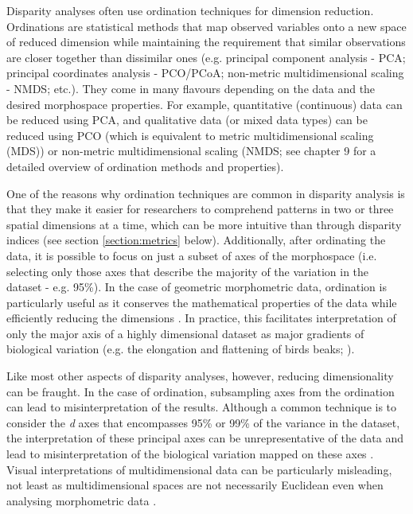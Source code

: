 \documentclass[12pt,letterpaper]{article}
\begin{document}
Disparity analyses often use ordination techniques for dimension reduction.
Ordinations are statistical methods that map observed variables onto a new space of reduced dimension while maintaining the requirement that similar observations are closer together than dissimilar ones (e.g. principal component analysis - PCA; principal coordinates analysis - PCO/PCoA; non-metric multidimensional scaling - NMDS; etc.).
They come in many flavours depending on the data and the desired morphospace properties.
For example, quantitative (continuous) data can be reduced using PCA, and qualitative data (or mixed data types) can be reduced using PCO (which is equivalent to metric multidimensional scaling (MDS)) or non-metric multidimensional scaling (NMDS; see \citealt{Legendre2012} chapter 9 for a detailed overview of ordination methods and properties).

One of the reasons why ordination techniques are common in disparity analysis is that they make it easier for researchers to comprehend patterns in two or three spatial dimensions at a time, which can be more intuitive than through disparity indices (see section \ref{section:metrics} below).
Additionally, after ordinating the data, it is possible to focus on just a subset of axes of the morphospace (i.e.
selecting only those axes that describe the majority of the variation in the dataset - e.g. 95\%).
In the case of geometric morphometric data, ordination is particularly useful as it conserves the mathematical properties of the data while efficiently reducing the dimensions \citep{Legendre2012,dryden2016statistical}.
In practice, this facilitates interpretation of only the major axis of a highly dimensional dataset as major gradients of biological variation (e.g. the elongation and flattening of birds beaks; \citealt{bright2016shapes}).

Like most other aspects of disparity analyses, however, reducing dimensionality can be fraught.
In the case of ordination, subsampling axes from the ordination can lead to misinterpretation of the results.
Although a common technique is to consider the \textit{d} axes that encompasses 95\% or 99\% of the variance in the dataset, the interpretation of these principal axes can be unrepresentative of the data and lead to misinterpretation of the biological variation mapped on these axes \citep{Bookstein2015, Weisbecker2019}.
Visual interpretations of multidimensional data can be particularly misleading, not least as multidimensional spaces are not necessarily Euclidean even when analysing morphometric data \citep{Deline2018, Gerber2017}.
\end{document}
